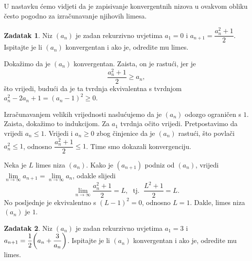 \documentclass{book}
\let\originalleft\left
\let\originalright\right
\renewcommand{\left}{\mathopen{}\mathclose\bgroup\originalleft}
\renewcommand{\right}{\aftergroup\egroup\originalright}
\renewenvironment{proof}{%
    \vspace{-\parskip}\begin{oldproof}%
    }{%
    \end{oldproof}%
}
\theoremstyle{definition}
\theoremstyle{definition}
\newtheorem{exercise}{Zadatak}
\theoremstyle{remark}
\begin{document}
U nastavku ćemo vidjeti da je zapisivanje konvergentnih nizova u ovakvom obliku često pogodno za izračunavanje njihovih limesa.
\begin{exercise}
Niz $(a_n)$ je zadan rekurzivno uvjetima $a_1=0$ i $a_{n+1}=\dfrac{a_n^2+1}{2}$. Ispitajte je li $(a_n)$ konvergentan i ako je, odredite mu limes.
\end{exercise}
\begin{proof}[Rješenje]
Dokažimo da je $(a_n)$ konvergentan. Zaista, on je rastući, jer je 
$$\dfrac{a_n^2+1}{2}\geq a_n,$$
što vrijedi, budući da je ta tvrdnja ekvivalentna s tvrdnjom $a_n^2-2a_n+1=(a_n-1)^2\geq 0$. 

Izračunavanjem velikih vrijednosti naslućujemo da je $(a_n)$ odozgo ograničen s $1$. Zaista, dokažimo to indukcijom. Za $a_1$ tvrdnja očito vrijedi. Pretpostavimo da vrijedi $a_n\leq 1$. Vrijedi i $a_n\geq 0$ zbog činjenice da je $(a_n)$ rastući, što povlači $a_n^2\leq 1$, odnosno $\dfrac{a_n^2+1}{2}\leq 1$. Time smo dokazali konvergenciju. 

Neka je $L$ limes niza $(a_n)$. Kako je $(a_{n+1})$ podniz od $(a_n)$, vrijedi $\lim\limits_{n\to \infty}{a_{n+1}}=\lim\limits_{n\to \infty}{a_n}$, odakle slijedi
$$\lim\limits_{n\to \infty}{\dfrac{a_n^2+1}{2}}=L,\;\text{ tj. }\; \dfrac{L^2+1}{2}=L.$$
No posljednje je ekvivalentno s $(L-1)^2=0$, odnosno $L=1$. Dakle, limes niza $(a_n)$ je $1$.
\end{proof}
\begin{exercise}
Niz $(a_n)$ je zadan rekurzivno uvjetima $a_1=3$ i $a_{n+1}=\dfrac{1}{2}\left(a_n+\dfrac{3}{a_n}\right)$. Ispitajte je li $(a_n)$ konvergentan i ako je, odredite mu limes.
\end{exercise}
\end{document}
